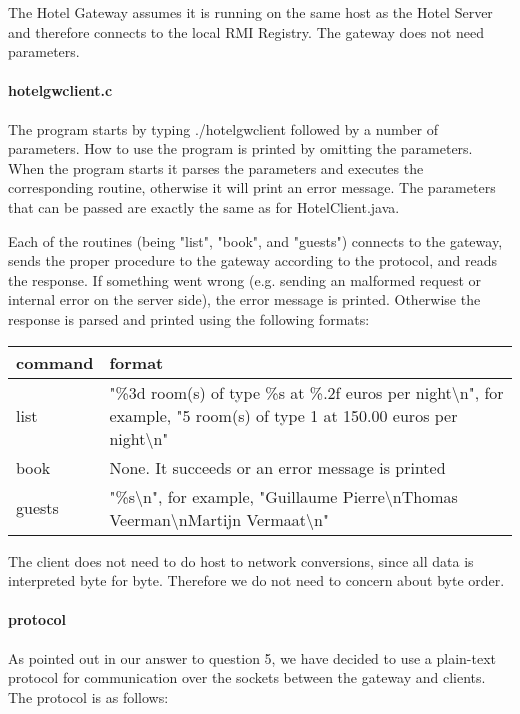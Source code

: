 \documentclass[a4paper,10pt]{article}
\begin{document}
The Hotel Gateway assumes it is running on the same host as the Hotel Server and therefore connects to the local RMI Registry. The gateway does not need parameters.

\paragraph{hotelgwclient.c}
The program starts by typing ./hotelgwclient followed by a number of parameters. How to use the program is printed by omitting the parameters. When the program starts it parses the parameters and executes the corresponding routine, otherwise it will print an error message. The parameters that can be passed are exactly the same as for HotelClient.java.

Each of the routines (being "list", "book", and "guests") connects to the gateway, sends the proper procedure to the gateway according to the protocol, and reads the response. If something went wrong (e.g. sending an malformed request or internal error on the server side), the error message is printed. Otherwise the response is parsed and printed using the following formats:

\begin{center}
\begin{tabular}{ l | p{9.3cm} }
\textbf{command} & \textbf{format}\\ \hline
list & "\%3d room(s) of type \%s at \%.2f euros per night\textbackslash n", for example, "5 room(s) of type 1 at 150.00 euros per night\textbackslash n"\\ \hline
book & None. It succeeds or an error message is printed \\ \hline
guests & "\%s\textbackslash n", for example, "Guillaume Pierre\textbackslash nThomas Veerman\textbackslash nMartijn Vermaat\textbackslash n" \\
\end{tabular}
\end{center}

The client does not need to do host to network conversions, since all data is interpreted byte for byte. Therefore we do not need to concern about byte order.

\paragraph{protocol}
As pointed out in our answer to question 5, we have decided to use a plain-text protocol for communication over the sockets between the gateway and clients. The protocol is as follows:
\end{document}
